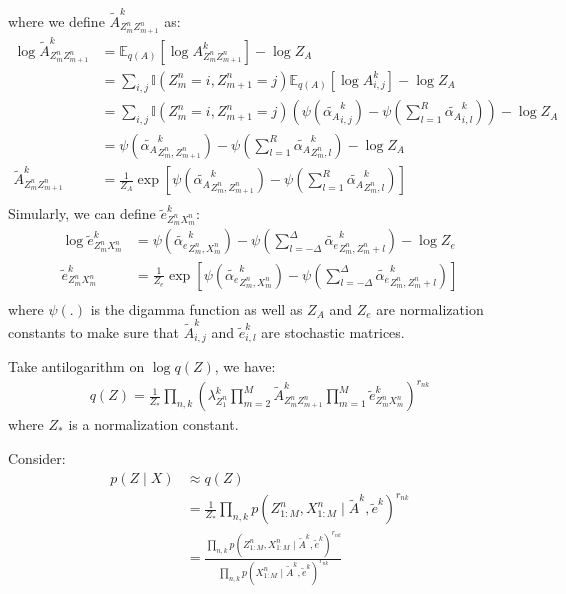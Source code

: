 \documentclass[12pt]{article}
\newenvironment{problem}[2][Problem]{\begin{trivlist}
\item[\hskip \labelsep {\bfseries #1}\hskip \labelsep {\bfseries #2.}]}{\end{trivlist}}
\begin{document}
\begin{problem}{2.8.24}
where we define $\tilde{A}^k_{Z^n_{m}Z^n_{m+1}}$ as:
\begin{align*}
    \log \tilde{A}^k_{Z^n_{m}Z^n_{m+1}} &= \mathbb{E}_{q(A)}[\log A^k_{Z^n_{m}Z^n_{m+1}}] - \log Z_{A}\\
    &= \sum_{i,j}\mathbb{I}(Z^n_{m} = i, Z^n_{m+1}=j)\mathbb{E}_{q(A)}[\log A^k_{i,j}] - \log Z_{A}\\
    &= \sum_{i,j}\mathbb{I}(Z^n_{m} = i, Z^n_{m+1}=j)
    (\psi(\tilde{\alpha_{A}}^k_{i,j}) -\psi(\sum_{l=1}^{R}\tilde{\alpha_{A}}^k_{i,l}))- \log Z_{A}\\
    &= \psi(\tilde{\alpha_{A}}^k_{Z^n_{m},Z^n_{m+1}}) -\psi(\sum_{l=1}^{R}\tilde{\alpha_{A}}^k_{Z^n_{m},l}) - \log Z_{A}\\
    \tilde{A}^k_{Z^n_{m}Z^n_{m+1}} &= \frac{1}{Z_{A}}
    \exp[\psi(\tilde{\alpha_{A}}^k_{Z^n_{m},Z^n_{m+1}}) -\psi(\sum_{l=1}^{R}\tilde{\alpha_{A}}^k_{Z^n_{m},l})] \\
\end{align*}
Simularly, we can define $\tilde{e}^k_{Z^n_m X^n_m}$:
\begin{align*}
    \log \tilde{e}^k_{Z^n_m X^n_m} 
    &= \psi(\tilde{\alpha_{e}}^k_{Z^n_{m},X^n_{m}}) -\psi(\sum_{l=-\Delta}^{\Delta}\tilde{\alpha_{e}}^k_{Z^n_{m},Z^n_{m}+l})
    - \log Z_{e}\\
    \tilde{e}^k_{Z^n_m X^n_m} &= \frac{1}{Z_{e}}
    \exp[\psi(\tilde{\alpha_{e}}^k_{Z^n_{m},X^n_{m}}) -\psi(\sum_{l=-\Delta}^{\Delta}\tilde{\alpha_{e}}^k_{Z^n_{m},Z^n_{m}+l})]\\
\end{align*}
where $\psi(.)$ is the digamma function as well as
$Z_{A}$ and $Z_{e}$ are normalization constants to make sure that $\tilde{A}^{k}_{i,j}$
and $\tilde{e}^{k}_{i,l}$ are stochastic matrices.

Take antilogarithm on $\log q(Z)$, we have:
\begin{align*}
    q(Z) = \frac{1}{Z_{*}}\prod_{n,k}(\lambda^k_{Z^n_{1}}
        \prod_{m=2}^{M}\tilde{A}^k_{Z^n_{m}Z^n_{m+1}}\prod_{m=1}^{M}\tilde{e}^k_{Z^n_m X^n_m})^{r_{nk}}
\end{align*}
where $Z_{*}$ is a normalization constant.

Consider:
\begin{align*}
    p(Z\mid X) &\approx q(Z) \\
    &= \frac{1}{Z_{*}}\prod_{n,k}p(Z^n_{1:M}, X^n_{1:M} \mid \tilde{A}^k, \tilde{e}^k)^{r_{nk}} \\
    &= \frac{\prod_{n,k}p(Z^n_{1:M}, X^n_{1:M} \mid \tilde{A}^k, \tilde{e}^k)^{r_{nk}}}
            {\prod_{n,k}p(X^n_{1:M} \mid \tilde{A}^k, \tilde{e}^k)^{r_{nk}}}
\end{align*}


\end{problem}
\end{document}
